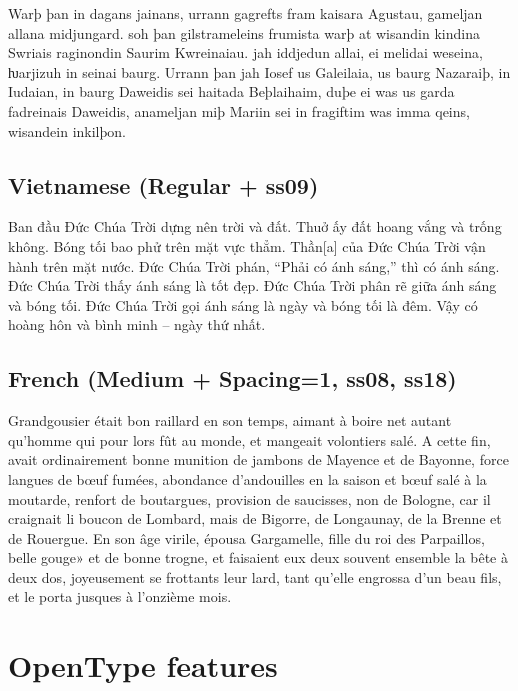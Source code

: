 \documentclass[12pt,letterpaper,openany]{book}
\begin{document}
{\italslantedmedium\large Warþ þan in dagans jainans, urrann gagrefts fram kaisara Agustau, gameljan allana midjungard. soh þan gilstrameleins frumista warþ at wisandin kindina Swriais raginondin Saurim Kwreinaiau. jah iddjedun allai, ei melidai weseina, ƕarjizuh in seinai baurg. Urrann þan jah Iosef us Galeilaia, us baurg Nazaraiþ, in Iudaian, in baurg Daweidis sei haitada Beþlaihaim, duþe ei was us garda fadreinais Daweidis, anameljan miþ Mariin sei in fragiftim was imma qeins, wisandein inkilþon.}

\section{Vietnamese (Regular + ss09)}

{Ban đầu Ðức Chúa Trời dựng nên trời và đất. Thuở ấy đất hoang vắng và trống không. Bóng tối bao phử trên mặt vực thẳm. Thần[a] của Ðức Chúa Trời vận hành trên mặt nước. Ðức Chúa Trời phán, “Phải có ánh sáng,” thì có ánh sáng. Ðức Chúa Trời thấy ánh sáng là tốt đẹp. Ðức Chúa Trời phân rẽ giữa ánh sáng và bóng tối. Ðức Chúa Trời gọi ánh sáng là ngày và bóng tối là đêm. Vậy có hoàng hôn và bình minh – ngày thứ nhất.}

\section{French (Medium + Spacing=1, ss08, ss18)}

{\mediumspaced{} Grandgousier était bon raillard en son temps,
aimant à boire net autant qu’homme qui pour lors fût
au monde, et mangeait volontiers salé. A cette fin,
avait ordinairement bonne munition de jambons de Mayence
et de Bayonne, force langues de bœuf fumées, abondance
d’andouilles en la saison et bœuf salé à la moutarde, renfort de
boutargues, provision de saucisses, non de Bologne, car il
craignait li boucon de Lombard, mais de Bigorre, de Longaunay,
de la Brenne et de Rouergue. En son âge virile, épousa
Gargamelle, fille du roi des Parpaillos, belle gouge» et de bonne
trogne, et faisaient eux deux souvent ensemble la bête à deux
dos, joyeusement se frottants leur lard, tant qu’elle engrossa
d’un beau fils, et le porta jusques à l’onzième mois.}



\chapter{OpenType features}
\end{document}
